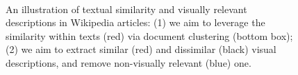 \documentclass[11pt,a4paper]{article}
\newcommand\gal[1]{\textcolor{bright}{\textbf{GAL:} #1 }}
\newcommand\yuval[1]{\textcolor{darkpink}{\textbf{YUVAL:} #1 }}
\newcommand\tzuf[1]{\textcolor{blue}{\textbf{TZUF:} #1 }}
\begin{document}
\begin{figure}[H]
\centering
{}
 \caption{An illustration of textual similarity and visually relevant descriptions in Wikipedia articles: (1) we aim to leverage the similarity within %
 texts (red) via document clustering (bottom box);
 (2) we aim to extract similar (red) and dissimilar (black) visual descriptions, and remove non-visually relevant (blue) one. %
 }\ %
\label{fig:bird_example}%
\end{figure}
\end{document}
